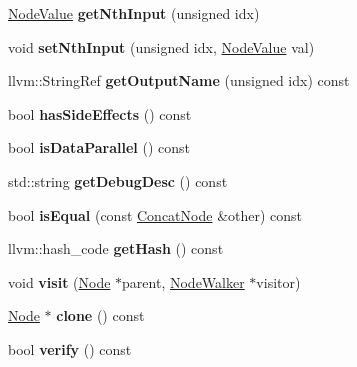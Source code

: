 \begin{DoxyCompactItemize}
\item 
\mbox{\label{classglow_1_1_concat_node_a4263951d9d15be0640343d72291cb81e}} 
\hyperlink{structglow_1_1_node_value}{Node\+Value} {\bfseries get\+Nth\+Input} (unsigned idx)
\item 
\mbox{\label{classglow_1_1_concat_node_a2b4f892d022079145406345f96e9e344}} 
void {\bfseries set\+Nth\+Input} (unsigned idx, \hyperlink{structglow_1_1_node_value}{Node\+Value} val)
\item 
\mbox{\label{classglow_1_1_concat_node_af2568b1ea111fa3534a8e535569793f7}} 
llvm\+::\+String\+Ref {\bfseries get\+Output\+Name} (unsigned idx) const
\item 
\mbox{\label{classglow_1_1_concat_node_ac2468fcebe13bcdf70ca40561f357c8d}} 
bool {\bfseries has\+Side\+Effects} () const
\item 
\mbox{\label{classglow_1_1_concat_node_a95b5a8909c4bbc0c8d84ab6f4d6a48eb}} 
bool {\bfseries is\+Data\+Parallel} () const
\item 
\mbox{\label{classglow_1_1_concat_node_a88c8abcb384d25ec83105017863c0fe3}} 
std\+::string {\bfseries get\+Debug\+Desc} () const
\item 
\mbox{\label{classglow_1_1_concat_node_acfc6382ccca44294f8bab9cf8962ad39}} 
bool {\bfseries is\+Equal} (const \hyperlink{classglow_1_1_concat_node}{Concat\+Node} \&other) const
\item 
\mbox{\label{classglow_1_1_concat_node_adc71c9b29a598580055a5f29e596743d}} 
llvm\+::hash\+\_\+code {\bfseries get\+Hash} () const
\item 
\mbox{\label{classglow_1_1_concat_node_a809c737c8ddc31c6775409571f769a0e}} 
void {\bfseries visit} (\hyperlink{classglow_1_1_node}{Node} $\ast$parent, \hyperlink{classglow_1_1_node_walker}{Node\+Walker} $\ast$visitor)
\item 
\mbox{\label{classglow_1_1_concat_node_aea278297182b799215a8e84ab63139ef}} 
\hyperlink{classglow_1_1_node}{Node} $\ast$ {\bfseries clone} () const
\item 
\mbox{\label{classglow_1_1_concat_node_a019f7269d2a971b8cc18f44dba758497}} 
bool {\bfseries verify} () const
\end{DoxyCompactItemize}
